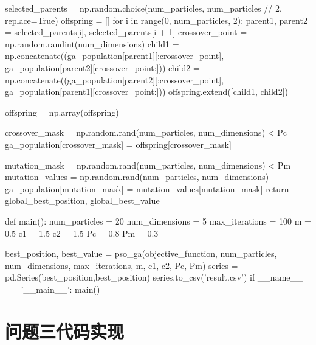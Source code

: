 \documentclass{article}
\numberwithin{equation}{subsection}
\begin{document}
\begin{python}
        selected_parents = np.random.choice(num_particles, num_particles // 2, replace=True)
        offspring = []
        for i in range(0, num_particles, 2):
            parent1, parent2 = selected_parents[i], selected_parents[i + 1]
            crossover_point = np.random.randint(num_dimensions)
            child1 = np.concatenate((ga_population[parent1][:crossover_point], ga_population[parent2][crossover_point:]))
            child2 = np.concatenate((ga_population[parent2][:crossover_point], ga_population[parent1][crossover_point:]))
            offspring.extend([child1, child2])

        offspring = np.array(offspring)

        crossover_mask = np.random.rand(num_particles, num_dimensions) < Pc
        ga_population[crossover_mask] = offspring[crossover_mask]

        mutation_mask = np.random.rand(num_particles, num_dimensions) < Pm
        mutation_values = np.random.rand(num_particles, num_dimensions)
        ga_population[mutation_mask] = mutation_values[mutation_mask]
    return global_best_position, global_best_value


def main():
    num_particles = 20
    num_dimensions = 5
    max_iterations = 100
    m = 0.5
    c1 = 1.5
    c2 = 1.5
    Pc = 0.8
    Pm = 0.3

    best_position, best_value = pso_ga(objective_function, num_particles, num_dimensions, max_iterations,
                                       m, c1, c2, Pc, Pm)
    series = pd.Series(best_position,best_position)
    series.to_csv('result.csv')
if __name__ == '__main__':
    main()
\end{python}

\section{问题三代码实现}
\end{document}
